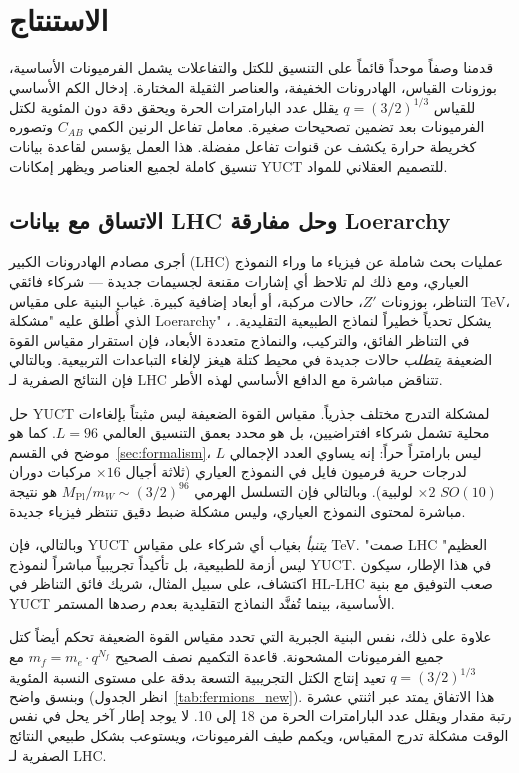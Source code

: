 \documentclass[11pt,a4paper]{article}
\begin{document}
	\section{الاستنتاج}
	\label{sec:conclusion}
	
	قدمنا وصفاً موحداً قائماً على التنسيق للكتل والتفاعلات يشمل الفرميونات الأساسية، بوزونات القياس، الهادرونات الخفيفة، والعناصر الثقيلة المختارة. إدخال الكم الأساسي للقياس \(q = (3/2)^{1/3}\) يقلل عدد البارامترات الحرة ويحقق دقة دون المئوية لكتل الفرميونات بعد تضمين تصحيحات صغيرة. معامل تفاعل الرنين الكمي \(C_{AB}\) وتصوره كخريطة حرارة يكشف عن قنوات تفاعل مفضلة. هذا العمل يؤسس لقاعدة بيانات تنسيق كاملة لجميع العناصر ويظهر إمكانات YUCT للتصميم العقلاني للمواد.
	
	\subsection{الاتساق مع بيانات LHC وحل مفارقة Loerarchy}
	
	أجرى مصادم الهادرونات الكبير (LHC) عمليات بحث شاملة عن فيزياء ما وراء النموذج العياري، ومع ذلك لم تلاحظ أي إشارات مقنعة لجسيمات جديدة — شركاء فائقي التناظر، بوزونات $Z'$، حالات مركبة، أو أبعاد إضافية كبيرة. غياب البنية على مقياس TeV، الذي أُطلق عليه "مشكلة Loerarchy" \cite{Koren2020}، يشكل تحدياً خطيراً لنماذج الطبيعية التقليدية. في التناظر الفائق، والتركيب، والنماذج متعددة الأبعاد، فإن استقرار مقياس القوة الضعيفة \emph{يتطلب} حالات جديدة في محيط كتلة هيغز لإلغاء التباعدات التربيعية. وبالتالي فإن النتائج الصفرية لـ LHC تتناقض مباشرة مع الدافع الأساسي لهذه الأطر.
	
	حل YUCT لمشكلة التدرج مختلف جذرياً. مقياس القوة الضعيفة ليس مثبتاً بإلغاءات محلية تشمل شركاء افتراضيين، بل هو محدد بعمق التنسيق العالمي $L=96$. كما هو موضح في القسم~\ref{sec:formalism}، $L$ ليس بارامتراً حراً: إنه يساوي العدد الإجمالي لدرجات حرية فرميون فايل في النموذج العياري (ثلاثة أجيال $\times 16$ مركبات دوران $SO(10)$ $\times 2$ لولبية). وبالتالي فإن التسلسل الهرمي $M_{\mathrm{Pl}}/m_W \sim (3/2)^{96}$ هو نتيجة مباشرة لمحتوى النموذج العياري، وليس مشكلة ضبط دقيق تنتظر فيزياء جديدة.
	
	وبالتالي، فإن YUCT \emph{يتنبأ} بغياب أي شركاء على مقياس TeV. "صمت LHC العظيم" ليس أزمة للطبيعية، بل تأكيداً تجريبياً مباشراً لنموذج YUCT. في هذا الإطار، سيكون اكتشاف، على سبيل المثال، شريك فائق التناظر في HL-LHC صعب التوفيق مع بنية YUCT الأساسية، بينما تُفنَّد النماذج التقليدية بعدم رصدها المستمر.
	
	علاوة على ذلك، نفس البنية الجبرية التي تحدد مقياس القوة الضعيفة تحكم أيضاً كتل جميع الفرميونات المشحونة. قاعدة التكميم نصف الصحيح $m_f = m_e \cdot q^{N_f}$ مع $q = (3/2)^{1/3}$ تعيد إنتاج الكتل التجريبية التسعة بدقة على مستوى النسبة المئوية وبنسق واضح (انظر الجدول~\ref{tab:fermions_new}). هذا الاتفاق يمتد عبر اثنتي عشرة رتبة مقدار ويقلل عدد البارامترات الحرة من 18 إلى 10. لا يوجد إطار آخر يحل في نفس الوقت مشكلة تدرج المقياس، ويكمم طيف الفرميونات، ويستوعب بشكل طبيعي النتائج الصفرية لـ LHC.
	
\end{document}

